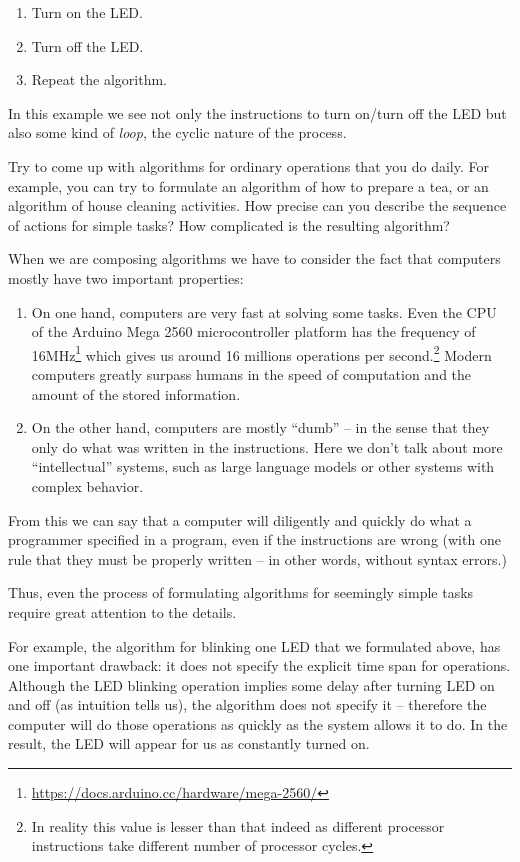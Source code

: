 \documentclass[../sparc.tex]{subfiles}
\begin{document}
\begin{enumerate}
\item Turn on the LED.
\item Turn off the LED.
\item Repeat the algorithm.
\end{enumerate}

In this example we see not only the instructions to turn on/turn off the LED but
also some kind of \emph{loop}, the cyclic nature of the process.

 { Try to come up with algorithms for ordinary operations that you
  do daily.  For example, you can try to formulate an algorithm of how to
  prepare a tea, or an algorithm of house cleaning activities.  How precise can
  you describe the sequence of actions for simple tasks?  How complicated is the
  resulting algorithm? }

When we are composing algorithms we have to consider the fact that computers
mostly have two important properties:
\begin{enumerate}
\item On one hand, computers are very fast at solving some tasks.  Even the CPU
  of the Arduino Mega 2560 microcontroller platform has the frequency of
  16MHz\footnote{\url{https://docs.arduino.cc/hardware/mega-2560/}} which gives
  us around 16 millions operations per second.\footnote{In reality this value is
  lesser than that indeed as different processor instructions take different
  number of processor cycles.}  Modern computers greatly surpass humans in the
  speed of computation and the amount of the stored information.
\item On the other hand, computers are mostly ``dumb'' -- in the sense that they
  only do what was written in the instructions.  Here we don't talk about more
  ``intellectual'' systems, such as large language models or other systems with
  complex behavior.
\end{enumerate}

From this we can say that a computer will diligently and quickly do what a
programmer specified in a program, even if the instructions are wrong (with one
rule that they must be properly written -- in other words, without syntax
errors.)

Thus, even the process of formulating algorithms for seemingly simple tasks
require great attention to the details.

For example, the algorithm for blinking one LED that we formulated above, has
one important drawback: it does not specify the explicit time span for
operations.  Although the LED blinking operation implies some delay after
turning LED on and off (as intuition tells us), the algorithm does not specify
it -- therefore the computer will do those operations as quickly as the system
allows it to do.  In the result, the LED will appear for us as constantly turned
on.
\end{document}

